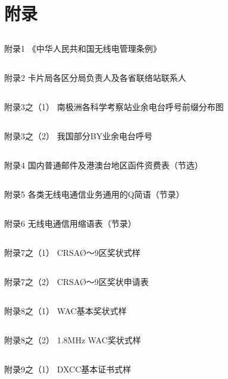 \documentclass[12pt,UTF8]{ctexbook}
\begin{document}
\backmatter

\chapter{附录}

\section{}附录1 《中华人民共和国无线电管理条例》
\section{}附录2 卡片局各区分局负责人及各省联络站联系人
\section{}附录3之（1） 南极洲各科学考察站业余电台呼号前缀分布图
\section{}附录3之（2） 我国部分BY业余电台呼号
\section{}附录4 国内普通邮件及港澳台地区函件资费表（节选）
\section{}附录5 各类无线电通信业务通用的Q简语（节录）
\section{}附录6 无线电通信用缩语表（节录）
\section{}附录7之（1） CRSAØ～9区奖状式样
\section{}附录7之（2） CRSAØ～9区奖状申请表
\section{}附录8之（1） WAC基本奖状式样
\section{}附录8之（2） 1.8MHz WAC奖状式样
\section{}附录9之（1） DXCC基本证书式样
\end{document}
